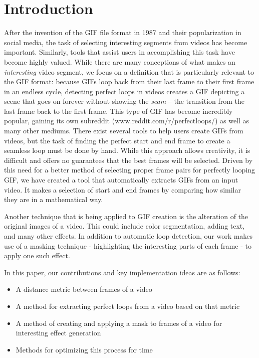 \section{Introduction}
\label{sec:Introduction}
After the invention of the GIF file format in 1987 and their popularization in social media, the task of selecting interesting segments from videos has become important. Similarly, tools that assist users in accomplishing this task have become highly valued. While there are many conceptions of what makes an \textit{interesting} video segment, we focus on a definition that is particularly relevant to the GIF format: because GIFs loop back from their last frame to their first frame in an endless cycle, detecting perfect loops in videos creates a GIF depicting a scene that goes on forever without showing the \textit{seam} -- the transition from the last frame back to the first frame. This type of GIF has become incredibly popular, gaining its own subreddit (www.reddit.com/r/perfectloops/) as well as many other mediums. There exist several tools to help users create GIFs from videos, but the task of finding the perfect start and end frame to create a seamless loop must be done by hand. While this approach allows creativity, it is difficult and offers no guarantees that the best frames will be selected. Driven by this need for a better method of selecting proper frame pairs for perfectly looping GIF, we have created a tool that automatically extracts GIFs from an input video. It makes a selection of start and end frames by comparing how similar they are in a mathematical way. 

Another technique that is being applied to GIF creation is the alteration of the original images of a video. This could include color segmentation, adding text, and many other effects. In addition to automatic loop detection, our work makes use of a masking technique - highlighting the interesting parts of each frame - to apply one such effect. 

In this paper, our contributions and key implementation ideas are as follows:
\begin{itemize}
  \item A distance metric between frames of a video
  \item A method for extracting perfect loops from a video based on that metric
  \item A method of creating and applying a mask to frames of a video for interesting effect generation
  \item Methods for optimizing this process for time
\end{itemize}
